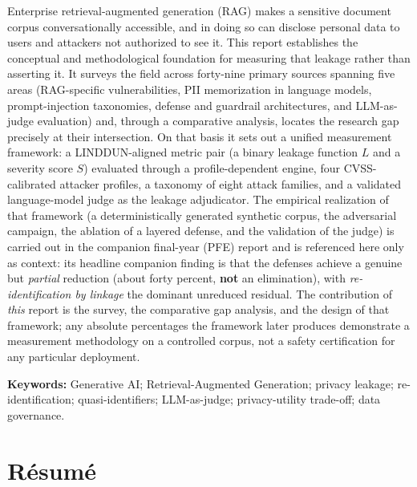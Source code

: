 \documentclass[12pt,a4paper]{report}
\begin{document}
\noindent Enterprise retrieval-augmented generation (RAG) makes a sensitive document
corpus conversationally accessible, and in doing so can disclose personal data to users and
attackers not authorized to see it. This report establishes the conceptual and methodological foundation for measuring that leakage
rather than asserting it. It surveys the field across forty-nine primary sources spanning five
areas (RAG-specific vulnerabilities, PII memorization in language models, prompt-injection
taxonomies, defense and guardrail architectures, and LLM-as-judge evaluation) and, through a
comparative analysis, locates the research gap precisely at their intersection. On that basis it
sets out a unified measurement framework: a LINDDUN-aligned metric pair (a binary leakage function
$L$ and a severity score $S$) evaluated through a profile-dependent engine, four CVSS-calibrated
attacker profiles, a taxonomy of eight attack families, and a validated language-model judge as the
leakage adjudicator. The empirical realization of that framework (a deterministically generated
synthetic corpus, the adversarial campaign, the ablation of a layered defense, and the validation of
the judge) is carried out in the companion final-year (PFE) report and is referenced here only as
context: its headline companion finding is that the defenses achieve a genuine but \emph{partial}
reduction (about forty percent, \textbf{not} an elimination), with \emph{re-identification by linkage}
the dominant unreduced residual. The contribution of \emph{this} report is the survey, the comparative
gap analysis, and the design of that framework; any absolute percentages the framework later produces
demonstrate a measurement methodology on a controlled corpus, not a safety certification for any
particular deployment.

\medskip
\noindent\textbf{Keywords:} Generative AI; Retrieval-Augmented Generation; privacy leakage;
re-identification; quasi-identifiers; LLM-as-judge; privacy-utility trade-off; data governance.

\chapter*{Résumé}
\end{document}
